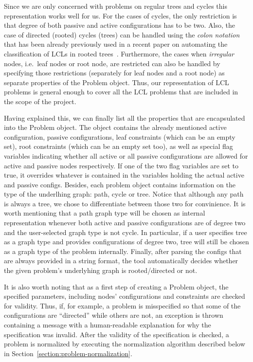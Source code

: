 Since we are only concerned with problems on regular trees and cycles
this representation works well for us. For the cases of cycles,
the only restriction is that degree of both passive and
active configurations has to be two. Also, the case
of directed (rooted) cycles (trees) can be handled
using the \emph{colon notation} that has been already
previously used in a recent paper on automating
the classification of LCLs in rooted trees~\cite{Balliu2021}.
Furthermore, the cases when \emph{irregular} nodes, i.e.\ leaf
nodes or root node, are restricted can also
be handled by specifying those restrictions
(separately for leaf nodes and a root node)
as separate properties of the Problem object.
Thus, our representation of LCL problems is general
enough to cover all the LCL problems that are
included in the scope of the project.

Having explained this, we can finally list all the
properties that are encapsulated into the
Problem object. The object contains the already
mentioned active configuration, passive configurations,
leaf constraints (which can be an empty set), root constraints
(which can be an empty set too), as well as special flag variables
indicating whether all active or all passive configurations
are allowed for active and passive nodes respectively.
If one of the two flag variables are set to true,
it overrides whatever is contained in the variables
holding the actual active and passive configs.
Besides, each problem object contains information
on the type of the underlhing graph: path, cycle or
tree. Notice that although any path is always a tree,
we chose to differentiate between those two
for convinience. It is worth mentioning that
a path graph type will be chosen as internal
representation whenever both active and
passive configurations are of degree two and
the user-selected graph type is not cycle.
In particular, if a user specifies tree as a graph
type and provides configurations of degree two,
tree will still be chosen as a graph type of the problem
internally. Finally, after parsing the configs
that are always provided in a string format,
the tool automatically decides whether the given problem's
underlyhing graph is rooted/directed or not.

It is also worth noting that as a first step of
creating a Problem object, the specified parameters,
including nodes' configurations and constraints
are checked for validity. Thus, if, for example,
a problem is misspecified so that some of the
configurations are ``directed'' while others are not,
an exception is thrown containing a message with
a human-readable explanation for why the
specification was invalid. After the validity
of the specification is checked, a problem is
normalized by executing the normalization algorithm
described below in Section~\ref{section:problem-normalization}.

